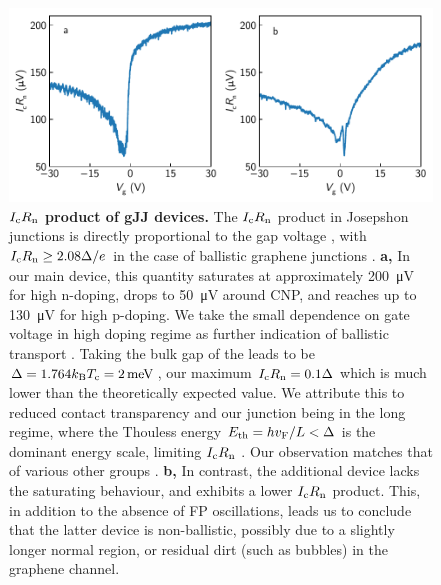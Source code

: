 \documentclass[preprint,
  onecolumn,
  notitlepage,
  amsmath,amssymb,
  aip,
  apl,
]{revtex4-1}
\begin{document}
\begin{figure}[]
    \centering
    \includegraphics[width=\linewidth]{figs/si_icrn}
    \caption{{\bf $I_{\rm c} R_{\rm n}$ product of gJJ devices.}
        The $I_{\rm c} R_{\rm n}$ product in Josepshon junctions is directly proportional to the gap voltage \cite{tinkham_introduction_1996}, with $I_{\rm c} R_{\rm n}\geq2.08\Delta/e$ in the case of ballistic graphene junctions \cite{titov_josephson_2006,cuevas_subharmonic_2006}.
        \textbf{a,} In our main device, this quantity saturates at approximately \SI{200}{\micro V} for high n-doping, drops to \SI{50}{\micro V} around CNP, and reaches up to \SI{130}{\micro V} for high p-doping.
        We take the small dependence on gate voltage in high doping regime as further indication of ballistic transport \cite{mizuno_ballisticlike_2013,zhu_supercurrent_2018}.
        Taking the bulk gap of the leads to be $\Delta=1.764 k_{\rm B} T_{\rm c} = \SI{2}{meV}$, our maximum $I_{\rm c} R_{\rm n}=0.1\Delta$ which is much lower than the theoretically expected value.
        We attribute this to reduced contact transparency and our junction being in the long regime, where the Thouless energy $E_{\rm th}=hv_{\rm F}/L < \Delta $ is the dominant energy scale, limiting $I_{\rm c} R_{\rm n}$ \cite{dubos_josephson_2001}.
        Our observation matches that of various other groups \cite{mizuno_ballisticlike_2013,benshalom_quantum_2015,borzenets_ballistic_2016a,zhu_supercurrent_2018}.
        \textbf{b,} In contrast, the additional device lacks the saturating behaviour, and exhibits a lower $I_{\rm c}R_{\rm n}$ product.
        This, in addition to the absence of FP oscillations, leads us to conclude that the latter device is non-ballistic, possibly due to a slightly longer normal region, or residual dirt (such as bubbles) in the graphene channel.
        }
    \label{fig:icrn}
\end{figure}
\end{document}

